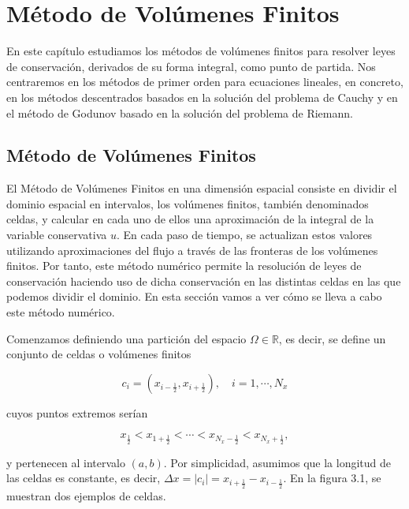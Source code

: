 \chapter{Método de Volúmenes Finitos}\label{ch:finitevolume}

En este capítulo estudiamos los métodos de volúmenes finitos para
resolver leyes de conservación, derivados de su forma integral, como
punto de partida.
Nos centraremos en los métodos de primer orden para ecuaciones
lineales, en concreto, en los métodos descentrados basados en la
solución del problema de Cauchy y en el método de Godunov basado en
la solución del problema de Riemann.

\section{Método de Volúmenes Finitos}

El Método de Volúmenes Finitos en una dimensión espacial consiste en
dividir el dominio espacial en intervalos, los volúmenes finitos,
también denominados celdas, y calcular en cada uno de ellos una
aproximación de la integral de la variable conservativa $u$.
En cada paso de tiempo, se actualizan estos valores utilizando
aproximaciones del flujo a través de las fronteras de los volúmenes
finitos.
Por tanto, este método numérico permite la resolución de leyes de
conservación haciendo uso de dicha conservación en las distintas
celdas en las que podemos dividir el dominio.
En esta sección vamos a ver cómo se lleva a cabo este método
numérico.

Comenzamos definiendo una partición del espacio
$\Omega\in\mathbb{R}$, es decir, se define un conjunto de celdas o
volúmenes finitos

\begin{equation*}
  c_{i}=
  \left(
  x_{i-\frac{1}{2}},
  x_{i+\frac{1}{2}}
  \right),\quad i=1,\cdots,N_{x}
\end{equation*}

cuyos puntos extremos serían

\begin{equation*}
  x_{\frac{1}{2}}<
  x_{1+\frac{1}{2}}<
  \cdots<
  x_{N_{x}-\frac{1}{2}}<
  x_{N_{x}+\frac{1}{2}},
\end{equation*}

y pertenecen al intervalo $\left(a,b\right)$.
Por simplicidad, asumimos que la longitud de las celdas es constante,
es decir,
\begin{math}
  \Delta x=
  \left|c_{i}\right|=
  x_{i+\frac{1}{2}}-
  x_{i-\frac{1}{2}}
\end{math}.
En la figura 3.1, se muestran dos ejemplos de celdas.


